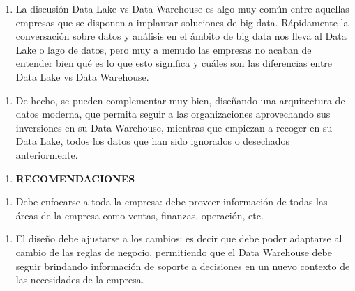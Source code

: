 \documentclass{article} %
\begin{document}
\noindent 

\begin{enumerate}
\item  La discusi\'{o}n Data Lake vs Data Warehouse es algo muy com\'{u}n entre aquellas empresas que se disponen a implantar soluciones de big data. R\'{a}pidamente la conversaci\'{o}n sobre datos y an\'{a}lisis en el \'{a}mbito de big data nos lleva al Data Lake o lago de datos, pero muy a menudo las empresas no acaban de entender bien qu\'{e} es lo que esto significa y cu\'{a}les son las diferencias entre Data Lake vs Data Warehouse.
\end{enumerate}

\noindent 

\begin{enumerate}
\item  De hecho, se pueden complementar muy bien, dise\~{n}ando una arquitectura de datos moderna, que permita seguir a las organizaciones aprovechando sus inversiones en su Data Warehouse, mientras que empiezan a recoger en su Data Lake, todos los datos que han sido ignorados o desechados anteriormente.
\end{enumerate}

\noindent 

\noindent 

\noindent 

\noindent \textbf{}

\begin{enumerate}
\item \textbf{ RECOMENDACIONES }
\end{enumerate}

\noindent \textbf{}

\begin{enumerate}
\item \textbf{ }Debe enfocarse a toda la empresa: debe proveer informaci\'{o}n de todas las \'{a}reas de la empresa como ventas, finanzas, operaci\'{o}n, etc.
\end{enumerate}

\noindent 

\begin{enumerate}
\item  El dise\~{n}o debe ajustarse a los cambios: es decir que debe poder adaptarse al cambio de las reglas de negocio, permitiendo que el Data Warehouse debe seguir brindando informaci\'{o}n de soporte a decisiones en un nuevo contexto de las necesidades de la empresa.
\end{enumerate}
\end{document}
